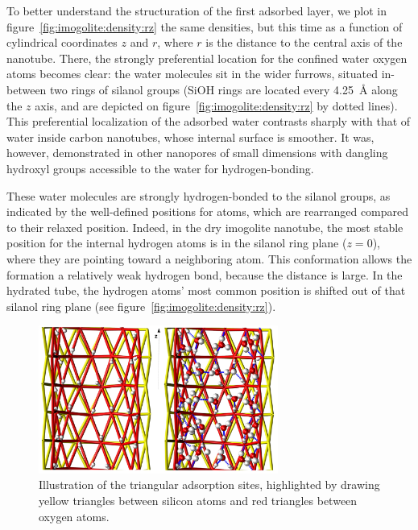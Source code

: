 \documentclass[thesis]{subfiles}
\begin{document}
To better understand the structuration of the first adsorbed layer, we plot in
figure~\ref{fig:imogolite:density:rz} the same densities, but this time as a
function of cylindrical coordinates $z$ and $r$, where $r$ is the distance
to the central axis of the nanotube. There, the strongly preferential location
for the confined water oxygen atoms becomes clear: the water molecules sit in
the wider furrows, situated in-between two rings of silanol groups (SiOH rings
are located every \SI{4.25}{\AA} along the $z$ axis, and are depicted on
figure~\ref{fig:imogolite:density:rz} by dotted lines). This preferential
localization of the adsorbed water contrasts sharply with that of water inside
carbon nanotubes, whose internal surface is smoother. It was, however,
demonstrated in other nanopores of small dimensions with dangling hydroxyl
groups accessible to the water for hydrogen-bonding\cite{Haigis2013}.

These water molecules are strongly hydrogen-bonded to the silanol groups, as
indicated by the well-defined positions for  atoms, which are
rearranged compared to their relaxed position. Indeed, in the dry imogolite
nanotube, the most stable position for the internal hydrogen atoms is in the
silanol ring plane ($z = 0$), where they are pointing toward a neighboring
 atom. This conformation allows the formation a relatively weak
hydrogen bond, because the  distance is
large. In the hydrated tube, the hydrogen atoms' most common position is shifted
out of that silanol ring plane (see figure~\ref{fig:imogolite:density:rz}).

\begin{figure}[p]
	\centering
	\includegraphics[width=0.7\textwidth]{figures/images/imogolite-hbonds-sites}
	\caption{Illustration of the triangular adsorption sites, highlighted by
    drawing yellow triangles between silicon atoms and red triangles between
    oxygen atoms.}
    \label{fig:imogolite:hbonds:sites}
\end{figure}
\end{document}

